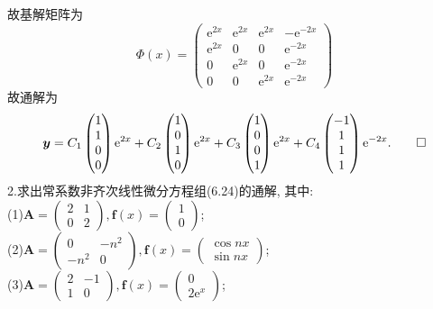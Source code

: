 \documentclass[titlepage,11pt,a4paper,twoside]{report}
\makeatletter
\newcommand\e{\mathrm{e}}
\newcommand\bmitPhi{\bm{\varPhi}}
\newenvironment{solve}{\par
	\pushQED{\qed}%
	\normalfont \topsep1\p@\@plus6\p@\relax
	\trivlist
	\item\relax
	{\hspace*{\parindent}{\heiti 解}\@addpunct{:}}\hspace\labelsep\ignorespaces
}{%
	\popQED\endtrivlist\@endpefalse
}
\makeatother
\begin{document}
\begin{solve}
故基解矩阵为
\[\bmitPhi(x)=\begin{pmatrix}\e^{2x}&\e^{2x}&\e^{2x}&-\e^{-2x}\\\e^{2x}&0&0&\e^{-2x}\\0&\e^{2x}&0&\e^{-2x}\\0&0&\e^{2x}&\e^{-2x}\end{pmatrix}\]
故通解为
\[\bm{y}=C_1\begin{pmatrix}1\\1\\0\\0\end{pmatrix}\e^{2x}+C_2\begin{pmatrix}1\\0\\1\\0\end{pmatrix}\e^{2x}+C_3\begin{pmatrix}1\\0\\0\\1\end{pmatrix}\e^{2x}+C_4\begin{pmatrix}-1\\1\\1\\1\end{pmatrix}\e^{-2x}.\qedhere\]
\end{solve}
2.求出常系数非齐次线性微分方程组(6.24)的通解, 其中:\\
(1)$\bm{A}=\begin{pmatrix}2&1\\0&2\end{pmatrix},\bm{f}(x)=\begin{pmatrix}1\\0\end{pmatrix}$;\\
(2)$\bm{A}=\begin{pmatrix}0&-n^2\\-n^2&0\end{pmatrix},\bm{f}(x)=\begin{pmatrix}\cos nx\\\sin nx\end{pmatrix}$;\\
(3)$\bm{A}=\begin{pmatrix}2&-1\\1&0\end{pmatrix},\bm{f}(x)=\begin{pmatrix}0\\2\e^x\end{pmatrix}$;\\
\end{document}
